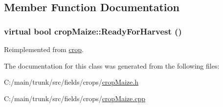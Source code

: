\subsection{Member Function Documentation}
\hypertarget{classcrop_maize_aad7767146cabf892674c77190b6782ef}{
\subsubsection[{ReadyForHarvest}]{\setlength{\rightskip}{0pt plus 5cm}virtual bool cropMaize::ReadyForHarvest ()}}
\label{classcrop_maize_aad7767146cabf892674c77190b6782ef}


Reimplemented from \hyperlink{classcrop_a8f2d5d0807fb0a81e50ea09e6df594ac}{crop}.

The documentation for this class was generated from the following files:\begin{DoxyCompactItemize}
\item 
C:/main/trunk/src/fields/crops/\hyperlink{crop_maize_8h}{cropMaize.h}\item 
C:/main/trunk/src/fields/crops/\hyperlink{crop_maize_8cpp}{cropMaize.cpp}\end{DoxyCompactItemize}
